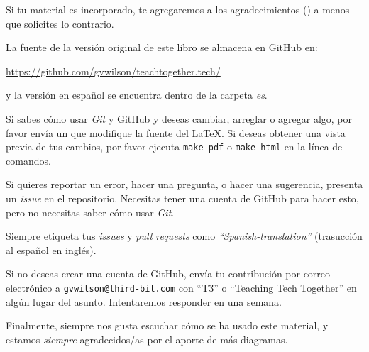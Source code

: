 Si tu material es incorporado,
te agregaremos a los agradecimientos () a menos que solicites lo contrario.

La fuente de la versión original de este libro se almacena en GitHub en:

\begin{center}
  \url{https://github.com/gvwilson/teachtogether.tech/}
\end{center}

y la versión en español se encuentra dentro de la carpeta \emph{es}.

\noindent
Si sabes cómo usar \emph{Git} y GitHub y deseas cambiar, arreglar o agregar algo,
por favor envía un  que modifique la fuente del LaTeX.
Si deseas obtener una vista previa de tus cambios,
por favor ejecuta \texttt{make~pdf} o \texttt{make~html} en la línea de comandos.

Si quieres reportar un error,
hacer una pregunta,
o hacer una sugerencia,
presenta un \emph{issue} en el repositorio.
Necesitas tener una cuenta de GitHub para hacer esto,
pero no necesitas saber cómo usar \emph{Git}.

Siempre etiqueta tus \emph{issues} y \emph{pull requests} 
como \emph{``Spanish-translation''} (trasucción al español en inglés).

Si no deseas crear una cuenta de GitHub,
envía tu contribución por correo electrónico a \texttt{gvwilson@third-bit.com}
con ``T3'' o ``Teaching Tech Together'' en algún lugar del asunto.
Intentaremos responder en una semana.

Finalmente,
siempre nos gusta escuchar cómo se ha usado este material,
y estamos \emph{siempre} agradecidos/as por el aporte de más diagramas.
